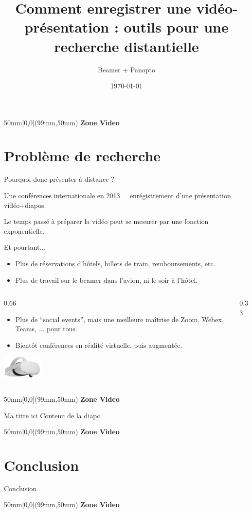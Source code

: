 \documentclass[12pt,aspectratio=169]{beamer}
\title[Conférence \LaTeX{}]{Comment enregistrer une vidéo-présentation : outils pour une recherche distantielle}
\author{Beamer + Panopto}
\date{\today}
\newcommand{\videoblock}{
    \begin{textblock*}{50mm}[0,0](99mm,50mm)
      { \centering \color{blue}\textbf{Zone Video}}
        \vspace{2.7cm}
    \end{textblock*}
}
\newcommand{\blockgauche}[1]{
	\begin{columns}
		\begin{column}{0.66\textwidth}
		#1
		\end{column}
		\begin{column}{0.33\textwidth}
		\end{column}
	\end{columns}
}
\begin{document}
\begin{frame}

     \titlepage
     \videoblock
\end{frame}

\section{Problème de recherche}


\begin{frame}{Pourquoi donc présenter à distance ?}

Une conférences internationale en 2013 = enrégistrement d'une présentation vidéo+diapos. 

Le temps passé à préparer la vidéo peut se mesurer par une fonction exponentielle. 

Et pourtant... 

\begin{itemize}
\item Plus de réservations d'hôtels, billets de train, remboursements, etc.
\item Plus de travail sur le beamer dans l'avion, ni le soir à l'hôtel.
\end{itemize}

\blockgauche{
\begin{itemize}
\item Plus de ``social events'', mais une meilleure maîtrise de Zoom, Webex, Teams, ... pour tous.
\item Bientôt conférences en réalité virtuelle, puis augmentée.
\end{itemize}

\vspace{-0.5cm}
\hspace{4cm} \includegraphics[width=2cm]{quest2.jpg}
}

\videoblock
\end{frame}

\begin{frame}{Ma titre ici}
Contenu de la diapo
\videoblock
\end{frame}

\section{Conclusion}
\begin{frame}{Conclusion}
\videoblock
\end{frame}
 
\end{document}
